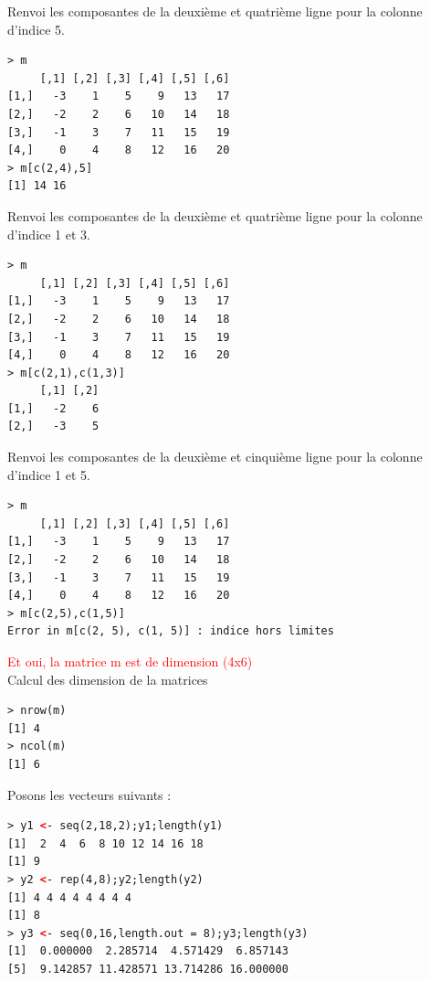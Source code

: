 Renvoi les composantes de la deuxième et quatrième ligne pour la colonne d'indice 5.
\begin{lstlisting}[language=html]
> m
     [,1] [,2] [,3] [,4] [,5] [,6]
[1,]   -3    1    5    9   13   17
[2,]   -2    2    6   10   14   18
[3,]   -1    3    7   11   15   19
[4,]    0    4    8   12   16   20
> m[c(2,4),5]
[1] 14 16
\end{lstlisting}
Renvoi les composantes de la deuxième et quatrième ligne pour la colonne d'indice 1 et 3.
\begin{lstlisting}[language=html]
> m
     [,1] [,2] [,3] [,4] [,5] [,6]
[1,]   -3    1    5    9   13   17
[2,]   -2    2    6   10   14   18
[3,]   -1    3    7   11   15   19
[4,]    0    4    8   12   16   20
> m[c(2,1),c(1,3)]
     [,1] [,2]
[1,]   -2    6
[2,]   -3    5
\end{lstlisting}
Renvoi les composantes de la deuxième et cinquième ligne pour la colonne d'indice 1 et 5.

\begin{lstlisting}[language=html]
> m
     [,1] [,2] [,3] [,4] [,5] [,6]
[1,]   -3    1    5    9   13   17
[2,]   -2    2    6   10   14   18
[3,]   -1    3    7   11   15   19
[4,]    0    4    8   12   16   20
> m[c(2,5),c(1,5)]
Error in m[c(2, 5), c(1, 5)] : indice hors limites
\end{lstlisting}
\textcolor{red}{Et oui, la matrice m est de dimension (4x6)}\newline
\\
Calcul des dimension de la matrices 
\begin{lstlisting}[language=html]
> nrow(m)
[1] 4
> ncol(m)
[1] 6
\end{lstlisting}
Posons les vecteurs suivants : 
\begin{lstlisting}[language=html]
> y1 <- seq(2,18,2);y1;length(y1)
[1]  2  4  6  8 10 12 14 16 18
[1] 9
> y2 <- rep(4,8);y2;length(y2)
[1] 4 4 4 4 4 4 4 4
[1] 8
> y3 <- seq(0,16,length.out = 8);y3;length(y3)
[1]  0.000000  2.285714  4.571429  6.857143
[5]  9.142857 11.428571 13.714286 16.000000
\end{lstlisting}

